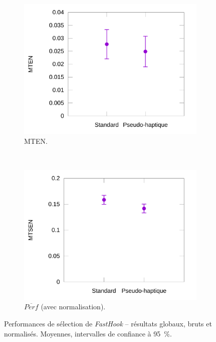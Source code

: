 \begin{figure}[htbp]
\begin{subfigure}[t]{0.49\textwidth}
			\includegraphics[width=\textwidth]{figures/ch5/phNormErrors}
			\caption{MTEN.}
			\label{fig:phNormErrors}
		\end{subfigure}
				~
		\begin{subfigure}[t]{0.49\textwidth}
			\centering
			\includegraphics[width=\textwidth]{figures/ch5/phNormProducts}
			\caption{$\overline{Perf}$ (avec normalisation).}
			\label{fig:phNormProducts}
		\end{subfigure}
		\caption[\emph{FastHook} -- résultats]{Performances de sélection de \emph{FastHook} -- résultats globaux, bruts et normalisés. Moyennes, intervalles de confiance à 95~\%{}.}
		\label{fig:fastHookAllRes}
	\end{figure}
	
